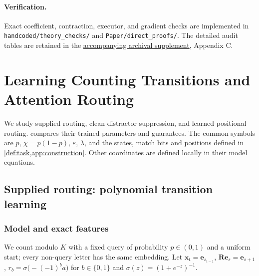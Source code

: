 \paragraph{Verification.}\label{app:verify}
Exact coefficient, contraction, executor, and gradient checks are implemented in
\nolinkurl{handcoded/theory_checks/} and \nolinkurl{Paper/direct_proofs/}.
The detailed audit tables are retained in the
\href{archival_full_version.pdf}{accompanying archival supplement}, Appendix C.

\section{Learning Counting Transitions and Attention Routing}
\label{app:joint}

We study supplied routing, clean distractor suppression, and learned positional routing.
 compares their trained parameters and guarantees.
The common symbols are $p$, $\chi=p(1-p)$, $\varepsilon$, $\lambda$, and the
states, match bits and positions defined in \cref{def:task,app:construction}.
Other coordinates are defined locally in their model equations.







\subsection{Supplied routing: polynomial transition learning}
\label{app:step-supplied-routing}



\subsubsection{Model and exact features}

We count modulo $K$ with a fixed query of probability $p\in(0,1)$ and a uniform start; every non-query letter has the same embedding. Let $\bm x_t=\bm e_{s_{t-1}}$, $\mathbf R\bm e_s=\bm e_{s+1}$, $r_b=\sigma\bigl(-(-1)^ba\bigr)$ for $b\in\{0,1\}$ and $\sigma(z)=(1+e^{-z})^{-1}$.

